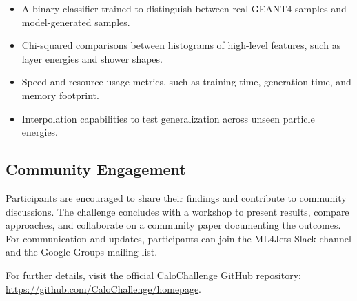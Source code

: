 \begin{itemize}
    \item A binary classifier trained to distinguish between real GEANT4 samples and model-generated samples.
    \item Chi-squared comparisons between histograms of high-level features, such as layer energies and shower shapes.
    \item Speed and resource usage metrics, such as training time, generation time, and memory footprint.
    \item Interpolation capabilities to test generalization across unseen particle energies.
\end{itemize}

\subsection{Community Engagement}

Participants are encouraged to share their findings and contribute to community discussions. The challenge concludes with a workshop to present results, compare approaches, and collaborate on a community paper documenting the outcomes. For communication and updates, participants can join the ML4Jets Slack channel and the Google Groups mailing list.

For further details, visit the official CaloChallenge GitHub repository: \url{https://github.com/CaloChallenge/homepage}.

